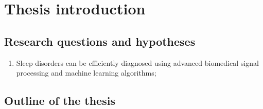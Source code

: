 \newcommand{\hypothesisSleepDisorders}{Sleep disorders can be efficiently diagnosed using advanced biomedical signal processing and machine learning algorithms}
\acresetall
\chapter{Thesis introduction}\label{chap:thesis-introduction}

\vspace{6cm}

\section{Research questions and hypotheses}

\begin{enumerate}[label={\footnotesize\bfseries\scshape RH~\arabic*}, ref={\bfseries\scshape RH~\arabic*}]
    \item \hypothesisSleepDisorders;\label{hypothesis:sleep-disorders}
\end{enumerate}

\section{Outline of the thesis}
